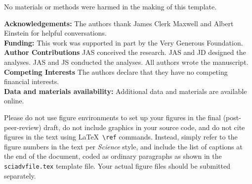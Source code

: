 \documentclass[12pt]{article}
\begin{document}
No materials or methods were harmed in the making of this template.







\noindent \textbf{Acknowledgements:} 
%
The authors thank James Clerk Maxwell and Albert Einstein for helpful conversations.\\
\noindent \textbf{Funding:} This work was supported in part by the Very Generous Foundation.\\
\noindent \textbf{Author Contributions} JAS conceived the research. JAS and JD designed the analyses. JAS and JS conducted the analyses. All authors wrote the manuscript.\\
\noindent \textbf{Competing Interests} The authors declare that they have no competing financial interests.\\
\noindent \textbf{Data and materials availability:} Additional data and materials are available online.







\clearpage

 Please do not use figure environments to set
up your figures in the final (post-peer-review) draft, do not include graphics in your
source code, and do not cite figures in the text using \LaTeX\
\verb+\ref+ commands.  Instead, simply refer to the figure numbers in
the text per {\it Science\/} style, and include the list of captions at
the end of the document, coded as ordinary paragraphs as shown in the
\texttt{sciadvfile.tex} template file.  Your actual figure files should
be submitted separately.
\end{document}
